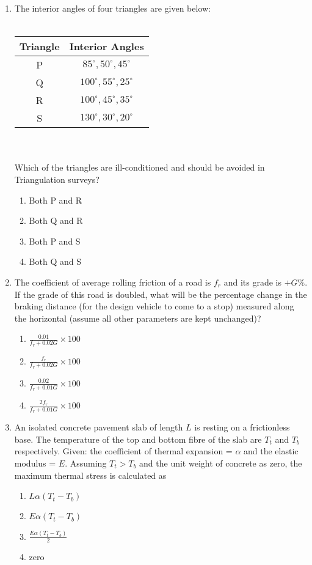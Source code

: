 \documentclass[12pt]{article}
\begin{document}
\begin{enumerate}[label=Q.\arabic*]
	\item The interior angles of four triangles are given below: \\\\
		\begin{tabular}{|c|c|}
			\hline
			\textbf{Triangle} & \textbf{Interior Angles} \\
			\hline
			P & $85^\circ, 50^\circ, 45^\circ$ \\
			Q & $100^\circ, 55^\circ, 25^\circ$ \\
			R & $100^\circ, 45^\circ, 35^\circ$ \\
			S & $130^\circ, 30^\circ, 20^\circ$ \\
			\hline
		\end{tabular}
		\\\\
		Which of the triangles are ill-conditioned and should be avoided in Triangulation surveys?
		\begin{enumerate}[label=(\Alph*)]
			\item Both P and R  
			\item Both Q and R  
			\item Both P and S  
			\item Both Q and S  
		\end{enumerate}
	\item The coefficient of average rolling friction of a road is $f_r$ and its grade is $+G\%$. If the grade of this road is doubled, what will be the percentage change in the braking distance (for the design vehicle to come to a stop) measured along the horizontal (assume all other parameters are kept unchanged)?
		\begin{multicols}{2}
			\begin{enumerate}[label=(\Alph*)]
				\item $\frac{0.01}{f_r+0.02G} \times 100$
				\item $\frac{f_r}{f_r+0.02G} \times 100$
				\item $\frac{0.02}{f_r+0.01G} \times 100$
				\item $\frac{2f_r}{f_r+0.01G} \times 100$
			\end{enumerate}
		\end{multicols}

	\item An isolated concrete pavement slab of length $L$ is resting on a frictionless base. The temperature of the top and bottom fibre of the slab are $T_t$ and $T_b$ respectively. Given: the coefficient of thermal expansion = $\alpha$ and the elastic modulus = $E$. Assuming $T_t > T_b$ and the unit weight of concrete as zero, the maximum thermal stress is calculated as  
		\begin{enumerate}[label=(\Alph*)]
			\item $L\alpha(T_t - T_b)$  
			\item $E\alpha(T_t - T_b)$  
			\item $\frac{E\alpha(T_t - T_b)}{2}$  
			\item zero  
		\end{enumerate}


\end{enumerate}
\end{document}
